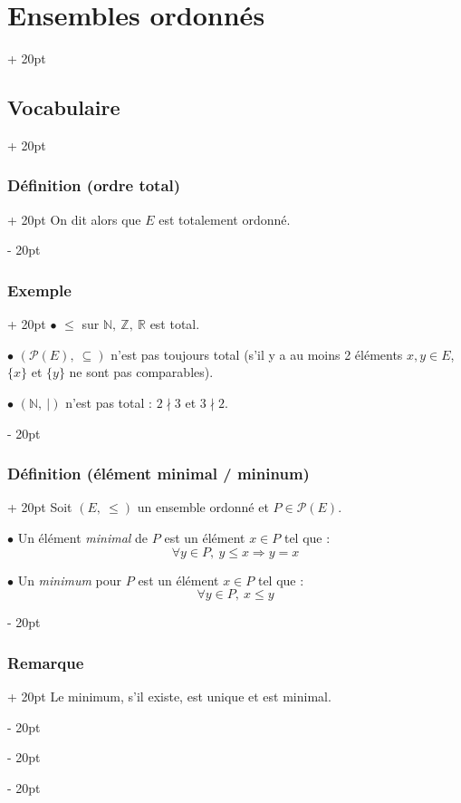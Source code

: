 \documentclass[a4paper, 12pt, twoside]{article}
\newcommand{\N}{\mathbb{N}} %
\newcommand{\Z}{\mathbb{Z}} %
\newcommand{\R}{\mathbb{R}} %
\renewcommand{\le}{\leqslant}
\newcommand{\ind}[1][20pt]{\advance\leftskip + #1}
\newcommand{\deind}[1][20pt]{\advance\leftskip - #1}
\newenvironment{indt}[2][20pt]{#2 \par \ind[#1]}{\par \deind} %
\begin{document}
\begin{indt}{\section{Ensembles ordonnés}}
\begin{indt}{\subsection{Vocabulaire}}
\begin{indt}{\subsubsection{Définition (ordre total)}}
                On dit alors que $E$ est totalement ordonné.
            \end{indt}
            
            \vspace{6pt}
            
            \begin{indt}{\subsubsection{Exemple}}
                $\bullet$ $\le$ sur $\N,\ \Z, \ \R$ est total.
                
                \vspace{6pt}
                
                $\bullet$ $(\mathcal P(E),\ \subseteq)$ n'est pas toujours total (s'il y a au moins 2 éléments $x, y \in E$, $\{x\}$ et $\{y\}$ ne sont pas comparables).
                
                \vspace{6pt}
                
                $\bullet$ $(\N,\ |)$ n'est pas total : $2 \nmid 3$ et $3 \nmid 2$.
            \end{indt}
            
            \vspace{6pt}
            
            \begin{indt}{\subsubsection{Définition (élément minimal / mininum)}}
                Soit $(E,\ \le)$ un ensemble ordonné et $P \in \mathcal P(E)$.
                
                $\bullet$ Un élément \textit{minimal} de $P$ est un élément $x \in P$ tel que :
                    \[ \forall y \in P,\ y \le x \Rightarrow y = x \]
                
                $\bullet$ Un \textit{minimum} pour $P$ est un élément $x \in P$ tel que :
                    \[ \forall y \in P,\ x \le y \]
            \end{indt}
            
            \vspace{6pt}
            
            \begin{indt}{\subsubsection{Remarque}}
                Le minimum, s'il existe, est unique et est minimal.
                

\end{indt}
\end{indt}
\end{indt}
\end{document}
